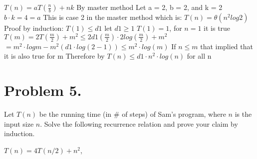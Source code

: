 \documentclass[11pt]{article}
\begin{document}
$T(n) = aT(\frac{n}{b}) + nk$
\newline
By master method
\newline
Let a = 2, b = 2, and k = 2
\newline
$b \cdot k = 4 = a$
\newline
This is case 2 in the master method which is:
\newline
\newline
$T(n) = \theta (n^2log2)$
\newline
\newline
Proof by induction:
\newline
\newline
$T(1) \leq d1$ let $d1 \geq 1$
\newline
$T(1) = 1$, for $n = 1$ it is true
\newline
\newline
$T(m) = 2T(\frac{m}{2}) + m^2 \leq 2d1(\frac{m}{2}) \cdot 2log(\frac{m}{2}) + m^2$
\newline
$= m^2 \cdot logm - m^2(d1 \cdot log(2-1)) \leq m^2 \cdot log(m)$
\newline
If $n \leq m$ that implied that it is also true for m
\newline
\newline
Therefore by $T(n) \leq d1 \cdot n^2 \cdot log(n)$ for all n
%

\newpage


\section*{Problem 5.}

Let $T(n)$ be the running time (in \# of steps) of Sam's program, where $n$ is the input size $n$.
Solve the following recurrence relation and prove your claim by induction.
\newline

$T(n)=4T(n/2)+n^2$,
\end{document}
